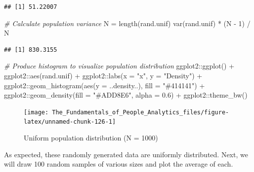 \documentclass[
]{book}
\newenvironment{Shaded}{\begin{snugshade}}{\end{snugshade}}
\newcommand{\AttributeTok}[1]{\textcolor[rgb]{0.77,0.63,0.00}{#1}}
\newcommand{\CommentTok}[1]{\textcolor[rgb]{0.56,0.35,0.01}{\textit{#1}}}
\newcommand{\DecValTok}[1]{\textcolor[rgb]{0.00,0.00,0.81}{#1}}
\newcommand{\FloatTok}[1]{\textcolor[rgb]{0.00,0.00,0.81}{#1}}
\newcommand{\FunctionTok}[1]{\textcolor[rgb]{0.00,0.00,0.00}{#1}}
\newcommand{\NormalTok}[1]{#1}
\newcommand{\OtherTok}[1]{\textcolor[rgb]{0.56,0.35,0.01}{#1}}
\newcommand{\SpecialCharTok}[1]{\textcolor[rgb]{0.00,0.00,0.00}{#1}}
\newcommand{\StringTok}[1]{\textcolor[rgb]{0.31,0.60,0.02}{#1}}
\begin{document}
\begin{verbatim}
## [1] 51.22007
\end{verbatim}

\begin{Shaded}
\begin{Highlighting}[]
\CommentTok{\# Calculate population variance}
\NormalTok{N }\OtherTok{=} \FunctionTok{length}\NormalTok{(rand.unif)}
\FunctionTok{var}\NormalTok{(rand.unif) }\SpecialCharTok{*}\NormalTok{ (N }\SpecialCharTok{{-}} \DecValTok{1}\NormalTok{) }\SpecialCharTok{/}\NormalTok{ N}
\end{Highlighting}
\end{Shaded}

\begin{verbatim}
## [1] 830.3155
\end{verbatim}

\begin{Shaded}
\begin{Highlighting}[]
\CommentTok{\# Produce histogram to visualize population distribution}
\NormalTok{ggplot2}\SpecialCharTok{::}\FunctionTok{ggplot}\NormalTok{() }\SpecialCharTok{+} 
\NormalTok{ggplot2}\SpecialCharTok{::}\FunctionTok{aes}\NormalTok{(rand.unif) }\SpecialCharTok{+} 
\NormalTok{ggplot2}\SpecialCharTok{::}\FunctionTok{labs}\NormalTok{(}\AttributeTok{x =} \StringTok{"x"}\NormalTok{, }\AttributeTok{y =} \StringTok{"Density"}\NormalTok{) }\SpecialCharTok{+} 
\NormalTok{ggplot2}\SpecialCharTok{::}\FunctionTok{geom\_histogram}\NormalTok{(}\FunctionTok{aes}\NormalTok{(}\AttributeTok{y =}\NormalTok{ ..density..), }\AttributeTok{fill =} \StringTok{"\#414141"}\NormalTok{) }\SpecialCharTok{+}
\NormalTok{ggplot2}\SpecialCharTok{::}\FunctionTok{geom\_density}\NormalTok{(}\AttributeTok{fill =} \StringTok{"\#ADD8E6"}\NormalTok{, }\AttributeTok{alpha =} \FloatTok{0.6}\NormalTok{) }\SpecialCharTok{+}
\NormalTok{ggplot2}\SpecialCharTok{::}\FunctionTok{theme\_bw}\NormalTok{()}
\end{Highlighting}
\end{Shaded}

\begin{figure}

{\centering \texttt{[image: The\_Fundamentals\_of\_People\_Analytics\_files/figure-latex/unnamed-chunk-126-1]} 

}

\caption{Uniform population distribution (N = 1000)}\label{fig:unnamed-chunk-126}
\end{figure}

As expected, these randomly generated data are uniformly distributed. Next, we will draw 100 random samples of various sizes and plot the average of each.
\end{document}
